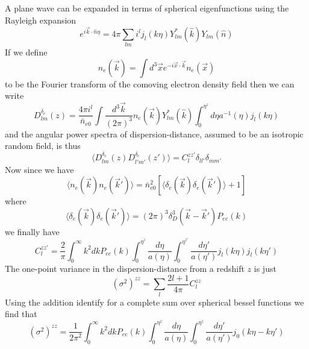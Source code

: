 \documentclass[twocolumn,prd,noshowpacs,nofootinbib,amsmath,amssymb]{revtex4}
\begin{document}
A plane wave can be expanded in terms of spherical eigenfunctions using the Rayleigh expansion
\begin{equation}
e^{i \vec{k}\cdot \hat{n} \eta} = 4\pi \sum_{l m} i^l j_{l}(k\eta) Y^*_{lm}(\hat{k})Y_{lm}(\hat{n})
\end{equation}
If we define 
\begin{equation}
n_e(\vec{k}) = \int d^3 \vec{x} e^{-i \vec{x}\cdot\vec{k}} n_e(\vec{x})
\end{equation}
to be the Fourier transform of the comoving electron density field then we can write
\begin{equation}
    D^{\delta_e}_{l m}(z) = \frac{4 \pi i^{l}}{\bar{n}_{e0}} \int \frac{d^3
    \vec{k}}{(2\pi)^3} n_e(\vec{k}) Y^*_{l m}(\hat{k}) \int_0^{\eta^z} d\eta a^{-1}(\eta) j_{l}(k\eta)
\end{equation}
and the angular power spectra of dispersion-distance, assumed to be an isotropic random field, is thus
\begin{equation}
    \langle D^{\delta_e}_{l m}(z) D^{\delta_e}_{l' m'}(z') \rangle = C_l^{z z'} \delta_{l l'} \delta_{m m'}
\end{equation}
Now since we have 
\begin{equation}
\langle n_e(\vec{k}) n_e(\vec{k}')\rangle = \bar{n}_{e0}^2\left[\langle \delta_e(\vec{k})\delta_e(\vec{k}')\rangle + 1 \right]
\end{equation}
where
\begin{equation}
\langle \delta_e(\vec{k})\delta_e(\vec{k}')\rangle = (2\pi)^3 \delta_{D}^3(\vec{k}-\vec{k}') P_{ee}(k)
\end{equation}
we finally have
\begin{equation}
C_l^{zz'}=\frac{2}{\pi} \int_0^{\infty}k^2 dk P_{ee}(k) \int_0^{\eta^z}\frac{d\eta}{a(\eta)} \int_0^{\eta^{z'}}\frac{d\eta'}{a(\eta')}  j_l(k\eta) j_l(k\eta')
\end{equation}
The one-point variance in the dispersion-distance from a redshift $z$ is just
\begin{equation}
(\sigma^2)^{zz}=\sum_{l} \frac{2l+1}{4\pi} C_l^{zz}
\end{equation}
Using the addition identify for a complete sum over spherical bessel functions we find that
\begin{equation}
(\sigma^2)^{zz}= \frac{1}{2\pi^2} \int_0^{\infty}k^2 dk P_{ee}(k) \int_0^{\eta^z}\frac{d\eta}{a(\eta)} \int_0^{\eta^{z}}\frac{d\eta'}{a(\eta')}  j_0(k\eta-k\eta')
\end{equation}
\end{document}
